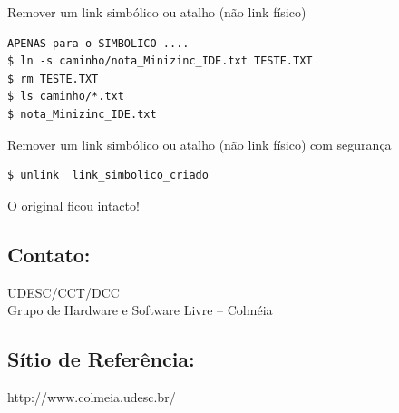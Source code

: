 \documentclass[final,a4paper]{article}
\begin{document}
\begin{description}
\pagebreak
\item[\ding{248}] Remover um link simbólico ou atalho (não link físico)

\begin{verbatim}
APENAS para o SIMBOLICO ....
$ ln -s caminho/nota_Minizinc_IDE.txt TESTE.TXT
$ rm TESTE.TXT 
$ ls caminho/*.txt
$ nota_Minizinc_IDE.txt
\end{verbatim}

\pagebreak
\item[\ding{248}] Remover um link simbólico ou atalho (não link físico)
com segurança
\begin{verbatim}
$ unlink  link_simbolico_criado
\end{verbatim}
O original ficou intacto!

\end{description}




\newpage
\subsection{Contato:}
UDESC/CCT/DCC \\
Grupo de Hardware e Software Livre -- Colméia\\

\subsection{Sítio de Referência:}

\textsf{http://www.colmeia.udesc.br/}
\end{document}
